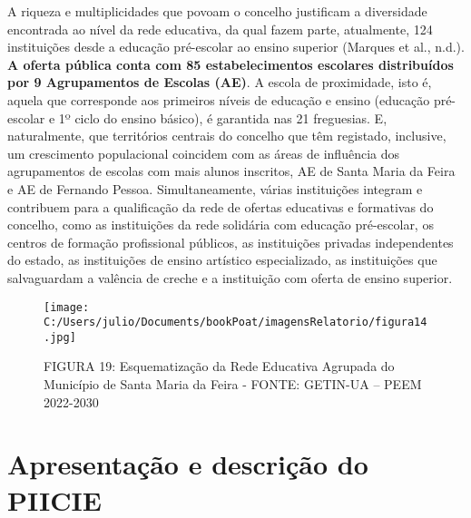 \documentclass[
]{book}
\begin{document}
A riqueza e multiplicidades que povoam o concelho justificam a diversidade encontrada ao nível da rede educativa, da qual fazem parte, atualmente, 124 instituições desde a educação pré-escolar ao ensino superior (Marques et al., n.d.). \textbf{A oferta pública conta com 85 estabelecimentos escolares distribuídos por 9 Agrupamentos de Escolas (AE)}. A escola de proximidade, isto é, aquela que corresponde aos primeiros níveis de educação e ensino (educação pré-escolar e 1º ciclo do ensino básico), é garantida nas 21 freguesias. E, naturalmente, que territórios centrais do concelho que têm registado, inclusive, um crescimento populacional coincidem com as áreas de influência dos agrupamentos de escolas com mais alunos inscritos, AE de Santa Maria da Feira e AE de Fernando Pessoa. Simultaneamente, várias instituições integram e contribuem para a qualificação da rede de ofertas educativas e formativas do concelho, como as instituições da rede solidária com educação pré-escolar, os centros de formação profissional públicos, as instituições privadas independentes do estado, as instituições de ensino artístico especializado, as instituições que salvaguardam a valência de creche e a instituição com oferta de ensino superior.

\begin{figure}
\centering
\texttt{[image: C:/Users/julio/Documents/bookPoat/imagensRelatorio/figura14.jpg]}
\caption{FIGURA 19: Esquematização da Rede Educativa Agrupada do Município de Santa Maria da Feira - FONTE: GETIN-UA -- PEEM 2022-2030}
\end{figure}

\hypertarget{apresentauxe7uxe3o-e-descriuxe7uxe3o-do-piicie}{%
\section{\texorpdfstring{\textbf{Apresentação e descrição do PIICIE}}{Apresentação e descrição do PIICIE}}\label{apresentauxe7uxe3o-e-descriuxe7uxe3o-do-piicie}}
\end{document}
